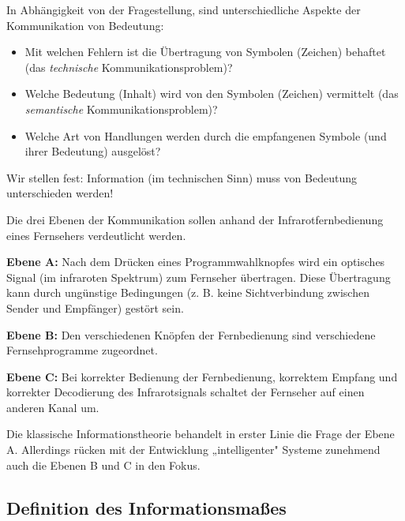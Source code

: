 
In Abhängigkeit von der Fragestellung, sind unterschiedliche Aspekte der Kommunikation von Bedeutung:

\begin{itemize}
  \item[\textbf{A.}] Mit welchen Fehlern ist die Übertragung von Symbolen (Zeichen) behaftet (das \textit{technische} Kommunikationsproblem)?
  \item[\textbf{B.}] Welche Bedeutung (Inhalt) wird von den Symbolen (Zeichen) vermittelt (das \textit{semantische} Kommunikationsproblem)?
  \item[\textbf{C.}] Welche Art von Handlungen werden durch die empfangenen Symbole (und ihrer Bedeutung) ausgelöst?
\end{itemize}

Wir stellen fest: Information (im technischen Sinn) muss von Bedeutung unterschieden werden!

\begin{beispiel}
Die drei Ebenen der Kommunikation sollen anhand der Infrarotfernbedienung eines Fernsehers verdeutlicht werden.

\textbf{Ebene A:} Nach dem Drücken eines Programmwahlknopfes wird ein optisches Signal (im infraroten Spektrum) zum Fernseher übertragen. Diese Übertragung kann durch ungünstige Bedingungen (z. B. keine Sichtverbindung zwischen Sender und Empfänger) gestört sein.

\textbf{Ebene B:} Den verschiedenen Knöpfen der Fernbedienung sind verschiedene Fernsehprogramme zugeordnet.

\textbf{Ebene C:} Bei korrekter Bedienung der Fernbedienung, korrektem Empfang und korrekter Decodierung des Infrarotsignals schaltet der Fernseher auf einen anderen Kanal um.
\end{beispiel}

Die klassische Informationstheorie behandelt in erster Linie die Frage der Ebene A. Allerdings rücken mit der Entwicklung „intelligenter" Systeme zunehmend auch die Ebenen B und C in den Fokus.

\subsection{Definition des Informationsmaßes}
\label{sec:informationsmass}

